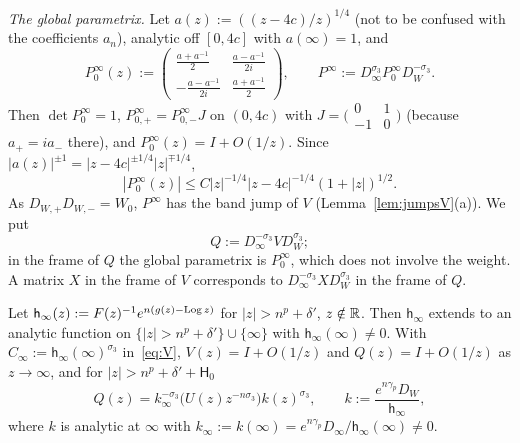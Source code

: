 \emph{The global parametrix.} Let $a(z):=((z-4c)/z)^{1/4}$ (not to be confused with the coefficients $a_n$), analytic off $[0,4c]$ with $a(\infty)=1$, and
\begin{equation}\label{eq:Pinf0}
  P^\infty_0(z):=\begin{pmatrix}\frac{a+a^{-1}}2&\frac{a-a^{-1}}{2i}\\[1mm]-\frac{a-a^{-1}}{2i}&\frac{a+a^{-1}}2\end{pmatrix},\qquad
  P^\infty:=D_\infty^{\sigma_3}P^\infty_0D_W^{-\sigma_3}.
\end{equation}
Then $\det P^\infty_0=1$, $P^\infty_{0,+}=P^\infty_{0,-}J$ on $(0,4c)$ with
$J=\bigl(\begin{smallmatrix}0&1\\-1&0\end{smallmatrix}\bigr)$ (because $a_+=ia_-$ there), and $P^\infty_0(z)=I+O(1/z)$.
Since $|a(z)|^{\pm1}=|z-4c|^{\pm1/4}|z|^{\mp1/4}$,
\begin{equation}\label{eq:Pinf0-bound}
  |P^\infty_0(z)|\le C|z|^{-1/4}|z-4c|^{-1/4}(1+|z|)^{1/2}.
\end{equation}
As $D_{W,+}D_{W,-}=W_0$, $P^\infty$ has the band jump of $V$ (Lemma~\ref{lem:jumpsV}(a)). We put
\begin{equation}\label{eq:Q}
  Q:=D_\infty^{-\sigma_3}VD_W^{\sigma_3};
\end{equation}
in the frame of $Q$ the global parametrix is $P^\infty_0$, which does not involve the weight. A matrix $X$ in the frame
of $V$ corresponds to $D_\infty^{-\sigma_3}XD_W^{\sigma_3}$ in the frame of $Q$.

\begin{lemma}\label{lem:normalisation}
Let $\mathsf h_\infty(z):=F(z)^{-1}e^{n(g(z)-\operatorname{Log} z)}$ for $|z|>n^p+\delta'$, $z\notin\mathbb{R}$. Then $\mathsf h_\infty$
extends to an analytic function on $\{|z|>n^p+\delta'\}\cup\{\infty\}$ with $\mathsf h_\infty(\infty)\ne0$. With
$C_\infty:=\mathsf h_\infty(\infty)^{\sigma_3}$ in~\eqref{eq:V}, $V(z)=I+O(1/z)$ and $Q(z)=I+O(1/z)$ as $z\to\infty$,
and for $|z|>n^p+\delta'+\mathsf H_0$
\begin{equation}\label{eq:Q-at-infinity}
  Q(z)=k_\infty^{-\sigma_3}\bigl(U(z)z^{-n\sigma_3}\bigr)k(z)^{\sigma_3},\qquad k:=\frac{e^{n\gamma_p}D_W}{\mathsf h_\infty},
\end{equation}
where $k$ is analytic at $\infty$ with $k_\infty:=k(\infty)=e^{n\gamma_p}D_\infty/\mathsf h_\infty(\infty)\ne0$.
\end{lemma}

